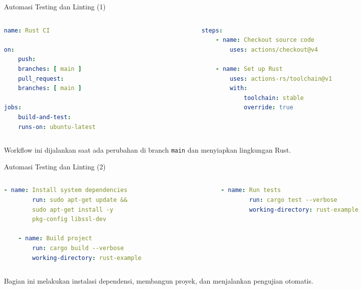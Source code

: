 \documentclass[aspectratio=169, table]{beamer}
\begin{document}
\begin{frame}[fragile]{Automasi Testing dan Linting (1)}
\vspace{10pt}
\begin{columns}[T]
\begin{column}{0.5\textwidth}
\begin{lstlisting}[language=yaml, firstnumber=1]
name: Rust CI

on:
	push:
	branches: [ main ]
	pull_request:
	branches: [ main ]

jobs:
	build-and-test:
	runs-on: ubuntu-latest
\end{lstlisting}
\end{column}

\begin{column}{0.5\textwidth}
\begin{lstlisting}[language=yaml, firstnumber=12]
steps:
	- name: Checkout source code
		uses: actions/checkout@v4

	- name: Set up Rust
		uses: actions-rs/toolchain@v1
		with:
			toolchain: stable
			override: true
\end{lstlisting}
\end{column}
\end{columns}

\vspace{6pt}
Workflow ini dijalankan saat ada perubahan di branch \texttt{main} dan menyiapkan lingkungan Rust.
\end{frame}

\begin{frame}[fragile]{Automasi Testing dan Linting (2)}
\vspace{10pt}
\begin{columns}[T]
\begin{column}{0.5\textwidth}
\begin{lstlisting}[language=yaml, firstnumber=21]
	- name: Install system dependencies
		run: sudo apt-get update &&
		sudo apt-get install -y
		pkg-config libssl-dev
	
	- name: Build project
		run: cargo build --verbose
		working-directory: rust-example
\end{lstlisting}
\end{column}

\begin{column}{0.5\textwidth}
\begin{lstlisting}[language=yaml, firstnumber=29]
	- name: Run tests
		run: cargo test --verbose
		working-directory: rust-example
\end{lstlisting}
\end{column}
\end{columns}

\vspace{6pt}
Bagian ini melakukan instalasi dependensi, membangun proyek, dan menjalankan pengujian otomatis.
\end{frame}
\end{document}
